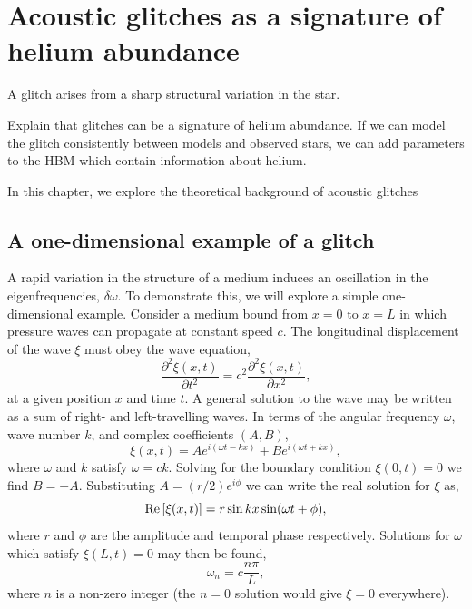 %
%
%
%
%
\chapter[Acoustic glitches]{Acoustic glitches as a signature of helium abundance}\label{chap:glitch}

A glitch arises from a sharp structural variation in the star.

Explain that glitches can be a signature of helium abundance. If we can model the glitch consistently between models and observed stars, we can add parameters to the HBM which contain information about helium.

In this chapter, we explore the theoretical background of acoustic glitches

\section[1D example]{A one-dimensional example of a glitch}\label{sec:1d-glitch}

A rapid variation in the structure of a medium induces an oscillation in the eigenfrequencies, \(\delta\omega\). To demonstrate this, we will explore a simple one-dimensional example. Consider a medium bound from \(x=0\) to \(x=L\) in which pressure waves can propagate at constant speed \(c\). The longitudinal displacement of the wave \(\xi\) must obey the wave equation,
%
\begin{equation}
    \frac{\partial^2\xi(x, t)}{\partial t^2} = c^2 \frac{\partial^2\xi(x, t)}{\partial x^2},
\end{equation}
%
at a given position \(x\) and time \(t\). A general solution to the wave may be written as a sum of right- and left-travelling waves. In terms of the angular frequency \(\omega\), wave number \(k\), and complex coefficients \((A, B)\),
%
\begin{equation}
    \xi(x, t) = A e^{i (\omega t - k x)} + B e^{i (\omega t + k x)},
\end{equation}
%
where \(\omega\) and \(k\) satisfy \(\omega = c k\). Solving for the boundary condition \(\xi(0, t) = 0\) we find \(B = - A\). Substituting \(A = (r/2) e^{i\phi}\) we can write the real solution for \(\xi\) as,
%
\begin{equation}
    {\mathrm{Re}}\left[\xi(x, t)\right] = r \sin k x \sin(\omega t + \phi),
\end{equation}
%
where \(r\) and \(\phi\) are the amplitude and temporal phase respectively. Solutions for \(\omega\) which satisfy \(\xi(L, t)=0\) may then be found,
%
\begin{equation}
    \omega_n = c \frac{n \pi}{L}, \label{eq:omega-n}
\end{equation}
%
where \(n\) is a non-zero integer (the \(n=0\) solution would give \(\xi=0\) everywhere).

